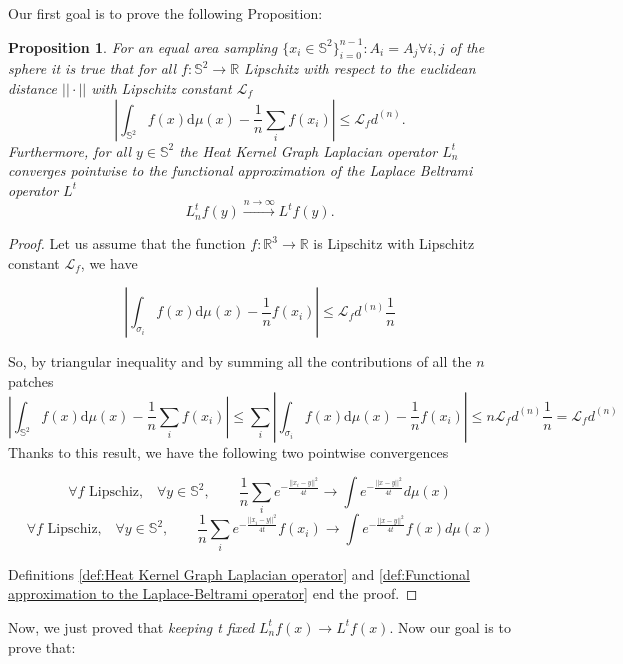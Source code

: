 \documentclass{article} %
\newtheorem{prop}{Proposition}
\begin{document}
Our first goal is to prove the following Proposition: 
\vspace{0.5cm}
\begin{prop}\label{prop:1}
	For an equal area sampling $\{x_i\in\mathbb S^2\}_{i=0}^{n-1}: A_i=A_j \forall i,j$ of the sphere it is true that for all $f: \mathbb S^2 \rightarrow \mathbb R$ Lipschitz with respect to the euclidean distance $||\cdot||$ with Lipschitz constant $\mathcal L_f$ 
	$$
	\left| \int_{\mathbb S^2}f({ x})\text{d}{\mu(x)} - \frac{1}{n}\sum_i f( x_i)\right|\leq \mathcal L_fd^{(n)}.
	$$
	Furthermore, for all $y\in\mathbb S^2$ the Heat Kernel Graph Laplacian operator $L^t_n$ converges pointwise to the functional approximation of the Laplace Beltrami operator $L^t$
	$$ L_n^tf(y)\xrightarrow{n\to\infty} L^tf(y).$$
\end{prop} 
\vspace{0.5cm}


\begin{proof}


	Let us assume that the function $f:\mathbb R^3\rightarrow \mathbb R$ is Lipschitz with Lipschitz constant $\mathcal L_f$, we have 
	
	$$\left| \int_{\sigma_{i}}f({ x})\text{d}{\mu(x)} - \frac{1}{n}f( x_i)\right| \leq \mathcal L_fd^{(n)}\frac{1}{n} $$

	So, by triangular inequality and by summing all the contributions of all the $n$ patches
	$$\left| \int_{\mathbb S^2}f({ x})\text{d}{\mu(x)} - \frac{1}{n}\sum_i f( x_i)\right| \leq \sum_i \left| \int_{\sigma_{i}}f({ x})\text{d}{\mu(x)} - \frac{1}{n}f( x_i)\right|\leq n  \mathcal L_fd^{(n)}\frac{1}{n} = \mathcal L_fd^{(n)}$$	
	Thanks to this result, we have the following two pointwise convergences
	
	$$\forall f \text{ Lipschiz,}\quad \forall y\in\mathbb S^2,  \quad\quad \frac{1}{n}\sum_i e^{-\frac{||x_i-y||^2}{4t}}\rightarrow \int e^{-\frac{||x-y||^2}{4t}}d\mu(x)$$
	$$\forall f \text{ Lipschiz,}\quad \forall y\in\mathbb S^2,  \quad\quad \frac{1}{n}\sum_i e^{-\frac{||x_i-y||^2}{4t}}f(x_i)\rightarrow \int e^{-\frac{||x-y||^2}{4t}}f(x)d\mu(x)$$
	
	Definitions \ref{def:Heat Kernel Graph Laplacian operator} and \ref{def:Functional approximation to the Laplace-Beltrami operator} end the proof.
\end{proof}
\vspace{0.5cm}

Now, we just proved that \textit{keeping t fixed} $L_n^tf(x)\rightarrow L^tf(x)$. Now our goal is to prove that:
\end{document}
